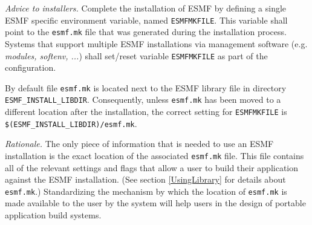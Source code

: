 {\em Advice to installers.} Complete the installation of ESMF by defining a single ESMF specific environment variable, named {\tt ESMFMKFILE}. This variable shall point to the {\tt esmf.mk} file that was generated during the installation process. Systems that support multiple ESMF installations via management software (e.g. {\em modules, softenv, ...}) shall set/reset variable {\tt ESMFMKFILE} as part of the configuration. 

By default file {\tt esmf.mk} is located next to the ESMF library file in  directory {\tt ESMF\_INSTALL\_LIBDIR}. Consequently, unless {\tt esmf.mk} has been moved to a different location after the installation, the correct setting for {\tt ESMFMKFILE} is {\tt \$(ESMF\_INSTALL\_LIBDIR)/esmf.mk}.

{\em Rationale.} The only piece of information that is needed to use an ESMF installation is the exact location of the associated {\tt esmf.mk} file. This file contains all of the relevant settings and flags that allow a user to build their application against the ESMF installation. (See section \ref{UsingLibrary} for details about {\tt esmf.mk}.) Standardizing the mechanism by which the location of {\tt esmf.mk} is made available to the user by the system will help users in the design of portable application build systems.

 



